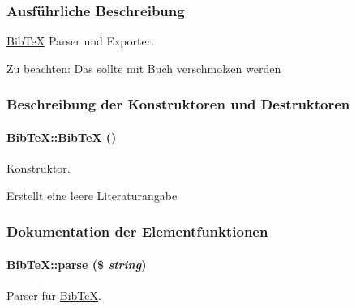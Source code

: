 \subsubsection{Ausf\"{u}hrliche Beschreibung}
\hyperlink{classBibTeX}{Bib\-Te\-X} Parser und Exporter. 

\begin{Desc}
\item[Zu beachten:]Das sollte mit Buch verschmolzen werden \end{Desc}




\subsubsection{Beschreibung der Konstruktoren und Destruktoren}
\hypertarget{classBibTeX_8f5bb42a792203a05dd14a55cd8e0fb3}{
\paragraph[BibTeX]{\setlength{\rightskip}{0pt plus 5cm}Bib\-Te\-X::Bib\-Te\-X ()}\hfill}
\label{classBibTeX_8f5bb42a792203a05dd14a55cd8e0fb3}


Konstruktor. 

Erstellt eine leere Literaturangabe 

\subsubsection{Dokumentation der Elementfunktionen}
\hypertarget{classBibTeX_0fcfbb98f28eb1700cd6877116dc57f6}{
\paragraph[parse]{\setlength{\rightskip}{0pt plus 5cm}Bib\-Te\-X::parse (\$ {\em string})}\hfill}
\label{classBibTeX_0fcfbb98f28eb1700cd6877116dc57f6}


Parser für \hyperlink{classBibTeX}{Bib\-Te\-X}. 

